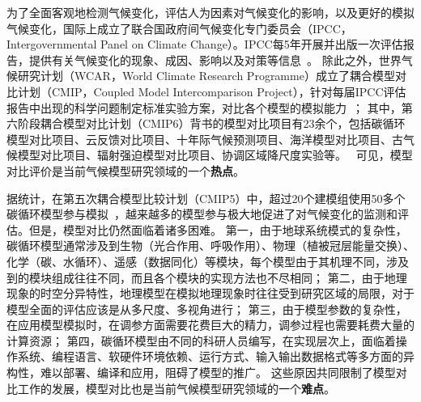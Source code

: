 
为了全面客观地检测气候变化，评估人为因素对气候变化的影响，以及更好的模拟气候变化，国际上成立了联合国政府间气候变化专门委员会（IPCC，Intergovernmental Panel on Climate Change）。IPCC每5年开展并出版一次评估报告，提供有关气候变化的现象、成因、影响以及对策等信息~\cite{Oliver2013Intergovernmental}。
除此之外，世界气候研究计划（WCAR，World Climate Research Programme）成立了耦合模型对比计划（CMIP，Coupled Model Intercomparison Project），针对每届IPCC评估报告中出现的科学问题制定标准实验方案，对比各个模型的模拟能力~\cite{meehl2000coupled}；
其中，第六阶段耦合模型对比计划（CMIP6）背书的模型对比项目有23余个，包括碳循环模型对比项目、云反馈对比项目、十年际气候预测项目、海洋模型对比项目、古气候模型对比项目、辐射强迫模型对比项目、协调区域降尺度实验等。~\cite{WCRP-CMIP6-Endorsed-CMIPs}
可见，模型对比评价是当前气候模型研究领域的一个\textbf{热点}。


据统计，在第五次耦合模型比较计划（CMIP5）中，超过20个建模组使用50多个碳循环模型参与模拟~\cite{Taylor2012An}，越来越多的模型参与极大地促进了对气候变化的监测和评估。但是，模型对比仍然面临着诸多困难。
第一，由于地球系统模式的复杂性，碳循环模型通常涉及到生物（光合作用、呼吸作用）、物理（植被冠层能量交换）、化学（碳、水循环）、遥感（数据同化）等模块，每个模型由于其机理不同，涉及到的模块组成往往不同，而且各个模块的实现方法也不尽相同；
第二，由于地理现象的时空分异特性，地理模型在模拟地理现象时往往受到研究区域的局限，对于模型全面的评估应该是从多尺度、多视角进行；
第三，由于模型参数的复杂性，在应用模型模拟时，在调参方面需要花费巨大的精力，调参过程也需要耗费大量的计算资源；
第四，碳循环模型由不同的科研人员编写，在实现层次上，面临着操作系统、编程语言、软硬件环境依赖、运行方式、输入输出数据格式等多方面的异构性，难以部署、编译和应用，阻碍了模型的推广。
这些原因共同限制了模型对比工作的发展，模型对比也是当前气候模型研究领域的一个\textbf{难点}。

